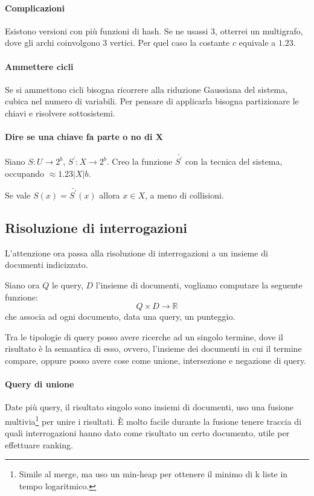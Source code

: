 \paragraph{Complicazioni}
Esistono versioni con più funzioni di hash. Se ne usassi $3$, otterrei un multigrafo, 
dove gli archi coinvolgono 3 vertici. Per quel caso la costante $c$ equivale a $1.23$.

\paragraph{Ammettere cicli}
Se si ammettono cicli bisogna ricorrere alla riduzione Gaussiana del sistema, cubica nel numero di variabili. 
Per pensare di applicarla bisogna partizionare le chiavi e risolvere sottosistemi.

\paragraph{Dire se una chiave fa parte o no di X}
Siano $S:U \longrightarrow 2^b$, $S^\prime : X \longrightarrow 2^b$. 
Creo la funzione $\bar{S^\prime}$ con la tecnica del sistema, occupando $\approx 1.23|X|b$.

Se vale $S(x) = \bar{S^\prime}(x)$ allora $x \in X$, a meno di collisioni.

\subsection{Risoluzione di interrogazioni}

L'attenzione ora passa alla risoluzione di interrogazioni a un insieme di
documenti indicizzato.

Siano ora $Q$ le query, $D$ l'insieme di documenti, vogliamo computare la seguente 
funzione: 
$$Q \times D \longrightarrow \mathbb{R}$$
che associa ad ogni documento, data una query, un punteggio.

Tra le tipologie di query posso avere ricerche ad un singolo termine, 
dove il risultato è la semantica di esso, ovvero, l'insieme dei documenti in cui il termine compare, oppure posso avere cose come unione, intersezione e negazione 
di query.

\paragraph{Query di unione}
Date più query, il risultato singolo sono insiemi di documenti, uso una fusione 
multivia\footnote{Simile al merge, ma uso un min-heap per ottenere il minimo di k liste in tempo logaritmico.} per unire i risultati.
È molto facile durante la fusione tenere traccia di quali interrogazioni hanno 
dato come risultato un certo documento, utile per effettuare ranking.

